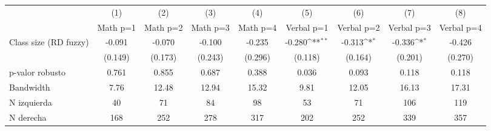 {
\def\sym#1{\ifmmode^{#1}\else\(^{#1}\)\fi}
\begin{tabular}{l*{8}{c}}
\toprule
            &\multicolumn{1}{c}{(1)}         &\multicolumn{1}{c}{(2)}         &\multicolumn{1}{c}{(3)}         &\multicolumn{1}{c}{(4)}         &\multicolumn{1}{c}{(5)}         &\multicolumn{1}{c}{(6)}         &\multicolumn{1}{c}{(7)}         &\multicolumn{1}{c}{(8)}         \\
            &\multicolumn{1}{c}{Math p=1}&\multicolumn{1}{c}{Math p=2}&\multicolumn{1}{c}{Math p=3}&\multicolumn{1}{c}{Math p=4}&\multicolumn{1}{c}{Verbal p=1}&\multicolumn{1}{c}{Verbal p=2}&\multicolumn{1}{c}{Verbal p=3}&\multicolumn{1}{c}{Verbal p=4}\\
\midrule
Class size (RD fuzzy)&      -0.091         &      -0.070         &      -0.100         &      -0.235         &      -0.280\sym{**} &      -0.313\sym{*}  &      -0.336\sym{*}  &      -0.426         \\
            &     (0.149)         &     (0.173)         &     (0.243)         &     (0.296)         &     (0.118)         &     (0.164)         &     (0.201)         &     (0.270)         \\
\midrule
p-valor robusto&       0.761         &       0.855         &       0.687         &       0.388         &       0.036         &       0.093         &       0.118         &       0.118         \\
Bandwidth   &        7.76         &       12.48         &       12.94         &       15.32         &        9.81         &       12.05         &       16.13         &       17.31         \\
N izquierda &          40         &          71         &          84         &          98         &          53         &          71         &         106         &         119         \\
N derecha   &         168         &         252         &         278         &         317         &         202         &         252         &         339         &         357         \\
\bottomrule
\end{tabular}
}
